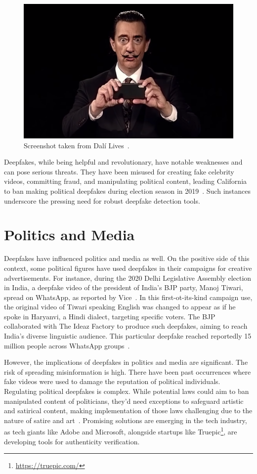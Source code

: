 \begin{figure}[ht]
	\centering
	\includegraphics[width=0.61\columnwidth]{figures/dali}
	\caption{Screenshot taken from Dalí Lives~\cite{salvador-dali-youtube}.}\label{dali-youtube}
\end{figure}

Deepfakes, while being helpful and revolutionary, have notable weaknesses and can pose serious
threats. They have been misused for creating fake celebrity videos, committing fraud, and manipulating
political content, leading California to ban making political deepfakes during election
season in 2019~\cite{salvador-dali,california}. Such instances underscore the pressing need for 
robust deepfake detection tools. 


\section{Politics and Media}
Deepfakes have influenced politics and media as well. On the positive side of this context,
some political figures have used deepfakes in their campaigns for creative advertisements.
For instance, during the 2020 Delhi Legislative Assembly election in India, a deepfake video
of the president of India's \ac{BJP} party, Manoj Tiwari, spread on WhatsApp, as reported
by Vice~\cite{vice}. In this first-ot-its-kind campaign use, the original video of Tiwari speaking
English was changed to appear as if he spoke in Haryanvi, a Hindi dialect, targeting specific
voters. The \ac{BJP} collaborated with The Ideaz Factory to produce such deepfakes, aiming to
reach India's diverse linguistic audience. This particular deepfake reached reportedly 15 million
people across WhatsApp groups~\cite{india}.

However, the implications of deepfakes in politics and
media are significant. The risk of spreading misinformation is high. There have been past
occurrences where fake videos were used to damage the reputation of political individuals.
Regulating political deepfakes is complex. While potential laws could aim to ban manipulated
content of politicians, they'd need exceptions to safeguard artistic and satirical content, making
implementation of those laws challenging due to the nature of satire and art~\cite{politics,vanity-fair}.
Promising solutions are emerging in the tech industry, as tech giants like Adobe and Microsoft, 
alongside startups like Truepic\footnote{\url{https://truepic.com/}}, are developing tools for 
authenticity verification.